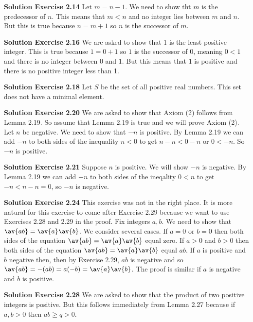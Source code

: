 \documentclass[oneside,12pt]{amsart}
\begin{document}
\bigskip


\textbf{Solution Exercise 2.14} Let $m=n-1$. We need to show tht $m$ is
the predecessor of $n$. This means that $m<n$ and no integer lies between
$m$ and $n$. But this is true because $n=m+1$ so $n$ is the successor of $m$.


\bigskip


\textbf{Solution Exercise 2.16} We are asked to show that $1$ is the least
positive integer. This is true because $1=0+1$ so $1$ is the successor of 0,
meaning $0 < 1$ and there is no integer between 0 and 1. But this means
that 1 is positive and there is no positive integer less than 1.

\bigskip


\textbf{Solution Exercise 2.18} Let $S$ be the set of all positive real
numbers. This set does not have a minimal element.


\bigskip


\textbf{Solution Exercise 2.20} We are asked to show that Axiom (2) follows
from Lemma 2.19. So assume that Lemma 2.19 is true and we will prove
Axiom (2). Let $n$ be negative. We need to show that $-n$ is positive.
By Lemma 2.19 we can add $-n$ to both sides of the inequality $n < 0$ to get
$n-n < 0 -n$ or $0 < -n$. So $-n$ is positive.

\bigskip


\textbf{Solution Exercise 2.21} Suppose $n$ is positive. We will show $-n$
is negative. By Lemma 2.19 we can add $-n$ to both sides of the
ineqality $0<n$ to get $-n < n-n = 0$, so $-n$ is negative.


\bigskip


\textbf{Solution Exercise 2.24} This exercise was not in the right place.
It is more natural for this exercise to come after Exercise 2.29 because we
want to use Exercises 2.28 and 2.29 in the proof. Fix integers $a,b$.
We need to show that $\av{ab} = \av{a}\av{b}$. We consider several cases.
If $a=0$ or $b=0$ then both sides of the equation
$\av{ab} = \av{a}\av{b}$ equal zero. If $a>0$ and $b>0$ then both sides of
the equation $\av{ab} = \av{a}\av{b}$ equal $ab$. If $a$ is positive and
$b$ negative then, then by Exercise 2.29, $ab$ is negative and so
$\av{ab} = -(ab) = a (-b) = \av{a}\av{b}$. The proof is similar if
$a$ is negative and $b$ is positive.

\bigskip


\textbf{Solution Exercise 2.28} We are asked to show that the product of two
positive integers is positive. But this follows immediately from
Lemma  2.27 because if $a,b>0$ then $ab\geq q > 0$.
\end{document}
